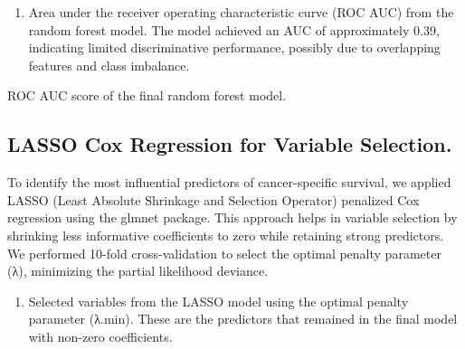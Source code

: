\documentclass[
  letterpaper,
  DIV=11,
  numbers=noendperiod]{scrartcl}
\providecommand{\tightlist}{%
  \setlength{\itemsep}{0pt}\setlength{\parskip}{0pt}}\usepackage{longtable,booktabs,array}
\begin{document}
\begin{enumerate}
\def\labelenumi{\arabic{enumi}.}
\setcounter{enumi}{3}
\tightlist
\item
  Area under the receiver operating characteristic curve (ROC AUC) from
  the random forest model. The model achieved an AUC of approximately
  0.39, indicating limited discriminative performance, possibly due to
  overlapping features and class imbalance.
\end{enumerate}

\begin{table}

\caption{\label{tbl-rf-auc}ROC AUC score of the final random forest
model.}


\end{table}%

\subsection{LASSO Cox Regression for Variable
Selection.}\label{lasso-cox-regression-for-variable-selection.}

To identify the most influential predictors of cancer-specific survival,
we applied LASSO (Least Absolute Shrinkage and Selection Operator)
penalized Cox regression using the glmnet package. This approach helps
in variable selection by shrinking less informative coefficients to zero
while retaining strong predictors. We performed 10-fold cross-validation
to select the optimal penalty parameter (λ), minimizing the partial
likelihood deviance.

\begin{enumerate}
\def\labelenumi{\arabic{enumi}.}
\setcounter{enumi}{4}
\tightlist
\item
  Selected variables from the LASSO model using the optimal penalty
  parameter (λ.min). These are the predictors that remained in the final
  model with non-zero coefficients.
\end{enumerate}
\end{document}
